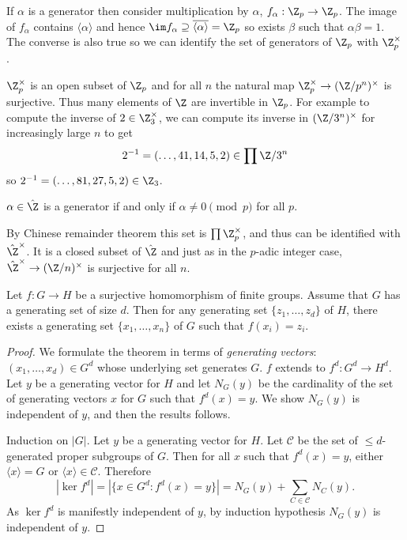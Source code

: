 \documentclass[a4paper]{article}
\begin{document}
If \(\alpha\) is a generator then consider multiplication by \(\alpha\), \(f_\alpha: \Z_p \to \Z_p\). The image of \(f_\alpha\) contains \(\langle\alpha\rangle\) and hence \(\im f_\alpha \supseteq \overline{\langle \alpha\rangle} = \Z_p\) so exists \(\beta\) such that \(\alpha\beta = 1\). The converse is also true so we can identify the set of generators of \(\Z_p\) with \(\Z_p^\times\).

\(\Z_p^\times\) is an open subset of \(\Z_p\) and for all \(n\) the natural map \(\Z_p^\times \to (\Z/p^n)^\times\) is surjective. Thus many elements of \(\Z\) are invertible in \(\Z_p\). For example to compute the inverse of \(2 \in \Z_3^\times\), we can compute its inverse in \((\Z/3^n)^\times\) for increasingly large \(n\) to get
\[
  2^{-1} = (\dots, 41, 14, 5, 2) \in \prod \Z/3^n
\]
so \(2^{-1} = (\dots, 81, 27, 5, 2) \in \Z_3\).

\begin{proposition}
  \(\alpha \in \hat \Z\) is a generator if and only if \(\alpha \ne 0 \pmod p\) for all \(p\).
\end{proposition}

By Chinese remainder theorem this set is \(\prod \Z_p^\times\), and thus can be identified with \(\hat \Z^\times\). It is a closed subset of \(\hat \Z\) and just as in the \(p\)-adic integer case, \(\hat \Z^\times \to (\Z/n)^\times\) is surjective for all \(n\).

\begin{theorem}
  Let \(f: G \to H\) be a surjective homomorphism of finite groups. Assume that \(G\) has a generating set of size \(d\). Then for any generating set \(\{z_1, \dots, z_d\}\) of \(H\), there exists a generating set \(\{x_1, \dots, x_n\}\) of \(G\) such that \(f(x_i) = z_i\).
\end{theorem}

\begin{proof}
  We formulate the theorem in terms of \emph{generating vectors}: \((x_1, \dots, x_d) \in G^d\) whose underlying set generates \(G\). \(f\) extends to \(f^d: G^d \to H^d\). Let \(y\) be a generating vector for \(H\) and let \(N_G(y)\) be the cardinality of the set of generating vectors \(x\) for \(G\) such that \(f^d(x) = y\). We show \(N_G(y)\) is independent of \(y\), and then the results follows.

  Induction on \(|G|\). Let \(y\) be a generating vector for \(H\). Let \(\mathcal C\) be the set of \(\leq d\)-generated proper subgroups of \(G\). Then for all \(x\) such that \(f^d(x) = y\), either \(\langle x \rangle = G\) or \(\langle x\rangle \in \mathcal C\). Therefore
  \[
    |\ker f^d| = |\{x \in G^d: f^d(x) = y\}| = N_G(y) + \sum_{C \in \mathcal C} N_C(y).
  \]
  As \(\ker f^d\) is manifestly independent of \(y\), by induction hypothesis \(N_G(y)\) is independent of \(y\).
\end{proof}
\end{document}
